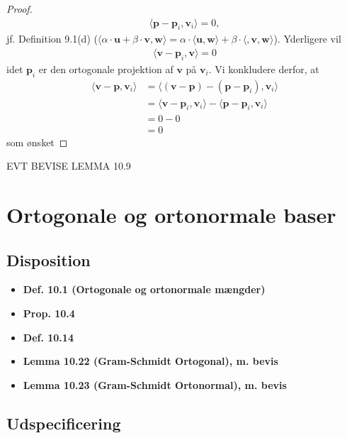 \documentclass[paper=a4, fontsize=11pt]{scrartcl} %
\begin{document}
\begin{proof}
		\begin{align*}
			\langle\mathbf{p}-\mathbf{p}_i,\mathbf{v}_i\rangle=0,
		\end{align*}
		jf. Definition 9.1(d) ($\langle\alpha\cdot\mathbf{u}+\beta\cdot\mathbf{v},\mathbf{w}\rangle=\alpha\cdot\langle\mathbf{u},\mathbf{w}\rangle+\beta\cdot\langle,\mathbf{v},\mathbf{w}\rangle$). Yderligere vil
		\begin{align*}
			\langle\mathbf{v}-\mathbf{p}_i,\mathbf{v}\rangle=0
		\end{align*}
		idet $\mathbf{p}_i$ er den ortogonale projektion af $\mathbf{v}$ på $\mathbf{v}_i$. Vi konkludere derfor, at 
		\begin{align*}
			\langle\mathbf{v}-\mathbf{p},\mathbf{v}_i\rangle&=\langle(\mathbf{v}-\mathbf{p})-(\mathbf{p}-\mathbf{p}_i),\mathbf{v}_i\rangle \\
			&=\langle\mathbf{v}-\mathbf{p}_i,\mathbf{v}_i\rangle-\langle\mathbf{p}-\mathbf{p}_i,\mathbf{v}_i\rangle \\
			&=0-0 \\
			&=0
		\end{align*}
		som ønsket
	\end{proof}
	
	EVT BEVISE LEMMA 10.9
	
	\newpage
	
	\section{Ortogonale og ortonormale baser}
	
	\subsection{Disposition}
	
	\begin{itemize}
		\item \textbf{Def. 10.1 (Ortogonale og ortonormale mængder)}
		\item \textbf{Prop. 10.4}
		\item \textbf{Def. 10.14}
		\item \textbf{Lemma 10.22 (Gram-Schmidt Ortogonal), m. bevis}
		\item \textbf{Lemma 10.23 (Gram-Schmidt Ortonormal), m. bevis}
	\end{itemize}
	
	\subsection{Udspecificering}
	
\end{document}
